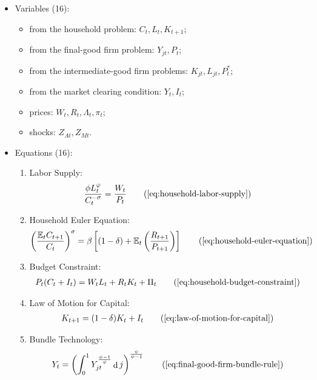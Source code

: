 \documentclass[
	12pt, 
	]{article}
\numberwithin{equation}{section}
\DeclareMathOperator{\dif}{d}
\theoremstyle{definition}
\theoremstyle{plain}
\theoremstyle{plain}
\theoremstyle{plain}
\begin{document}
{\singlespacing
	
\begin{itemize}
	\item Variables (16):

\begin{itemize}
	\item from the household problem: $C_t, L_t, K_{t+1}$;
	\item from the final-good firm problem: $Y_{jt}, P_t$;
	\item from the intermediate-good firm problems: $K_{jt}, L_{jt}, P_t^\ast$;
	\item from the market clearing condition: $Y_t, I_t$;
	\item prices: $W_t, R_t, \Lambda_t, \pi_t$;
	\item shocks: $Z_{At}, Z_{Mt}$.
\end{itemize}
	\item Equations (16):

\begin{enumerate}
	\item Labor Supply:
	\begin{align}
		\frac{\phi L_t^{\varphi}}{C_t^{-\sigma}} = \frac{W_t}{P_t}
		\tag{\ref{eq:household-labor-supply}}
	\end{align}
		
	\item Household Euler Equation:
	\begin{align}
		\left( \frac{\mathbb{E}_t C_{t+1}}{C_t} \right)^\sigma = \beta \left[ (1-\delta) + \mathbb{E}_t \left(\frac{R_{t+1}}{P_{t+1}}\right) \right]
		\tag{\ref{eq:household-euler-equation}}
	\end{align}
		
	\item Budget Constraint: 
	\begin{align}
		P_t (C_t + I_t) = W_t L_t + R_t K_t + \Pi_t
		\tag{\ref{eq:household-budget-constraint}}
	\end{align}
		
	\item Law of Motion for Capital:
	\begin{align}
		K_{t+1} = (1-\delta)K_t + I_t
		\tag{\ref{eq:law-of-motion-for-capital}}
	\end{align}
			
	\item Bundle Technology:
	\begin{align}
		Y_t = \left( \int_{0}^{1} Y_{jt}^{\frac{\psi-1}{\psi}} \dif j \right)^{\frac{\psi}{\psi-1}}
		\tag{\ref{eq:final-good-firm-bundle-rule}}
	\end{align}
	

\end{enumerate}
\end{itemize}}
\end{document}
